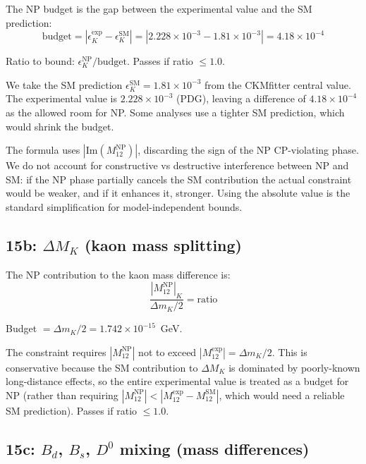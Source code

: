 \documentclass[11pt]{article}
\begin{document}
The NP budget is the gap between the experimental value and the SM prediction:
\begin{equation}
  \text{budget} = |\epsilon_K^{\mathrm{exp}} - \epsilon_K^{\mathrm{SM}}|
    = |2.228\times10^{-3} - 1.81\times10^{-3}| = 4.18\times10^{-4}
\end{equation}

Ratio to bound: $\epsilon_K^{\mathrm{NP}} / \text{budget}$.
Passes if ratio $\le 1.0$.

We take the SM prediction $\epsilon_K^{\mathrm{SM}} = 1.81\times10^{-3}$ from
the CKMfitter central value. The experimental value is $2.228\times10^{-3}$
(PDG), leaving a difference of $4.18\times10^{-4}$ as the allowed room for NP.
Some analyses use a tighter SM prediction, which would shrink the budget.

The formula uses $|\mathrm{Im}(M_{12}^{\mathrm{NP}})|$, discarding the sign of
the NP CP-violating phase. We do not account for constructive vs destructive
interference between NP and SM: if the NP phase partially cancels the SM
contribution the actual constraint would be weaker, and if it enhances it,
stronger. Using the absolute value is the standard simplification for
model-independent bounds.

\subsection{15b: $\Delta M_K$ (kaon mass splitting)}
\label{sec:step15b}

The NP contribution to the kaon mass difference is:
\begin{equation}
  \frac{|M_{12}^{\mathrm{NP}}|_K}{\Delta m_K / 2} = \text{ratio}
\end{equation}

Budget $= \Delta m_K/2 = 1.742\times10^{-15}$~GeV.

The constraint requires $|M_{12}^{\mathrm{NP}}|$ not to exceed
$|M_{12}^{\mathrm{exp}}| = \Delta m_K/2$.  This is conservative because the SM
contribution to $\Delta M_K$ is dominated by poorly-known long-distance effects,
so the entire experimental value is treated as a budget for NP (rather than
requiring $|M_{12}^{\mathrm{NP}}| < |M_{12}^{\mathrm{exp}} -
M_{12}^{\mathrm{SM}}|$, which would need a reliable SM prediction).
Passes if ratio $\le 1.0$.

\subsection{15c: $B_d$, $B_s$, $D^0$ mixing (mass differences)}
\label{sec:step15c}
\end{document}
